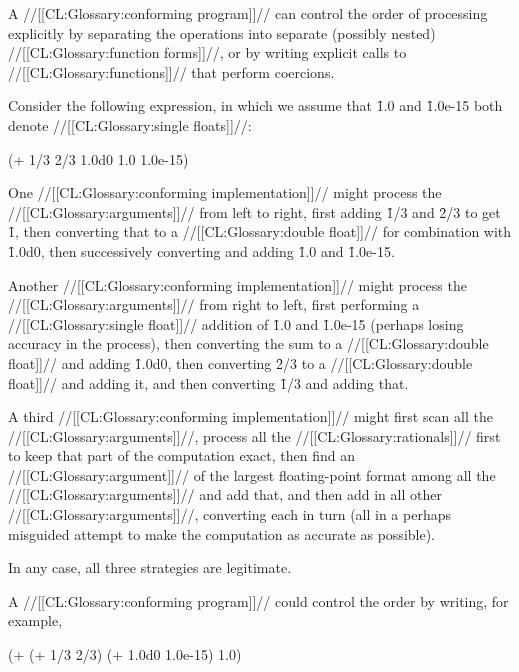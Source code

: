 A //[[CL:Glossary:conforming program]]// can control the order of processing explicitly by  separating the operations into separate (possibly nested) //[[CL:Glossary:function forms]]//, or by writing explicit calls to //[[CL:Glossary:functions]]// that perform coercions.


Consider the following expression, in which we assume that \f{1.0} and \f{1.0e-15} both denote //[[CL:Glossary:single floats]]//:

\code
 (+ 1/3 2/3 1.0d0 1.0 1.0e-15) \endcode

One //[[CL:Glossary:conforming implementation]]// might process the //[[CL:Glossary:arguments]]// from left to right, first adding \f{1/3} and \f{2/3} to get \f{1},  then converting that to a //[[CL:Glossary:double float]]//  for combination with \f{1.0d0}, then successively converting and adding \f{1.0} and \f{1.0e-15}.

Another //[[CL:Glossary:conforming implementation]]// might process the //[[CL:Glossary:arguments]]// from right to left, first performing a //[[CL:Glossary:single float]]// addition of \f{1.0} and \f{1.0e-15} (perhaps losing accuracy in the process), then converting the sum to  a //[[CL:Glossary:double float]]// and adding \f{1.0d0}, then converting \f{2/3} to a //[[CL:Glossary:double float]]// and adding it, and then converting \f{1/3} and adding that.

A third //[[CL:Glossary:conforming implementation]]// might first scan all the //[[CL:Glossary:arguments]]//, process all the //[[CL:Glossary:rationals]]// first to keep that part of the computation exact, then find an //[[CL:Glossary:argument]]// of the largest floating-point format among all the //[[CL:Glossary:arguments]]// and add that, and then add in all other //[[CL:Glossary:arguments]]//, converting each in turn (all in a perhaps misguided attempt to make the computation as accurate as possible).

In any case, all three strategies are legitimate.

A //[[CL:Glossary:conforming program]]// could control the order by writing, for example,

\code
 (+ (+ 1/3 2/3) (+ 1.0d0 1.0e-15) 1.0) \endcode

\endsubsubsubsection%

\endsubsubsection%

